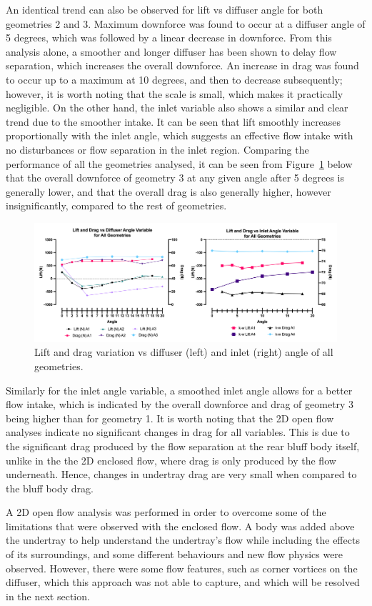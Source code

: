 \noindent An identical trend can also be observed for lift vs diffuser angle for both geometries 2 and 3. Maximum downforce was found to occur at a diffuser angle of 5 degrees, which was followed by a linear decrease in downforce. From this analysis alone, a smoother and longer diffuser has been shown to delay flow separation, which increases the overall downforce. An increase in drag was found to occur up to a maximum at 10 degrees, and then to decrease subsequently; however, it is worth noting that the scale is small, which makes it practically negligible. On the other hand, the inlet variable also shows a similar and clear trend due to the smoother intake. It can be seen that lift smoothly increases proportionally with the inlet angle, which suggests an effective flow intake with no disturbances or flow separation in the inlet region. Comparing the performance of all the geometries analysed, it can be seen from Figure~\ref{fig:2D_OF_PLOT_COMPARE_ALL} below that the overall downforce of geometry 3 at any given angle after 5 degrees is generally lower, and that the overall drag is also generally higher, however insignificantly, compared to the rest of geometries.

\begin{figure}[htb!]
    \centering
    \includegraphics[scale=0.9]{Figures/2D_OF/2D_OF_PLOT_COMPARE_ALL.png}
    \caption{Lift and drag variation vs diffuser (left) and inlet (right) angle of all geometries.}
    \label{fig:2D_OF_PLOT_COMPARE_ALL}
\end{figure}

\noindent Similarly for the inlet angle variable, a smoothed inlet angle allows for a better flow intake, which is indicated by the overall downforce and drag of geometry 3 being higher than for geometry 1. It is worth noting that the 2D open flow analyses indicate no significant changes in drag for all variables. This is due to the significant drag produced by the flow separation at the rear bluff body itself, unlike in the the 2D enclosed flow, where drag is only produced by the flow underneath. Hence, changes in undertray drag are very small when compared to the bluff body drag.

\noindent A 2D open flow analysis was performed in order to overcome some of the limitations that were observed with the enclosed flow. A body was added above the undertray to help understand the undertray's flow while including the effects of its surroundings, and some different behaviours and new flow physics were observed. However, there were some flow features, such as corner vortices on the diffuser, which this approach was not able to capture, and which  will be resolved in the next section.



